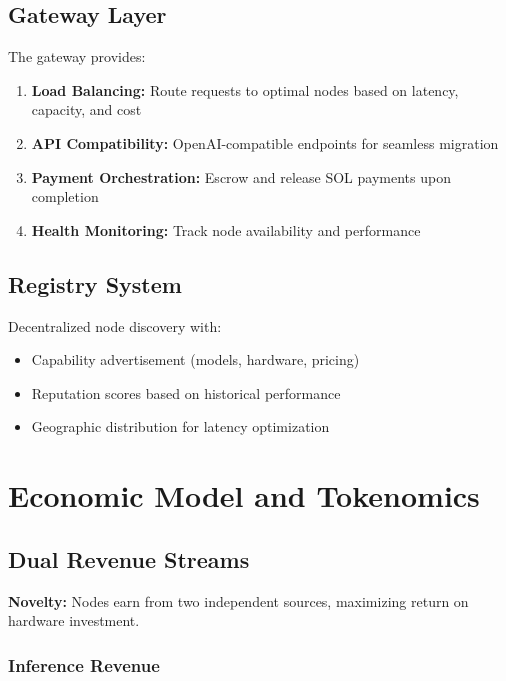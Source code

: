 \documentclass[11pt,a4paper]{article}
\begin{document}
\subsection{Gateway Layer}

The gateway provides:

\begin{enumerate}
    \item \textbf{Load Balancing:} Route requests to optimal nodes based on latency, capacity, and cost
    \item \textbf{API Compatibility:} OpenAI-compatible endpoints for seamless migration
    \item \textbf{Payment Orchestration:} Escrow and release SOL payments upon completion
    \item \textbf{Health Monitoring:} Track node availability and performance
\end{enumerate}

\subsection{Registry System}

Decentralized node discovery with:

\begin{itemize}
    \item Capability advertisement (models, hardware, pricing)
    \item Reputation scores based on historical performance
    \item Geographic distribution for latency optimization
\end{itemize}

\section{Economic Model and Tokenomics}

\subsection{Dual Revenue Streams}

\textbf{Novelty:} Nodes earn from two independent sources, maximizing return on hardware investment.

\subsubsection{Inference Revenue}
\end{document}
